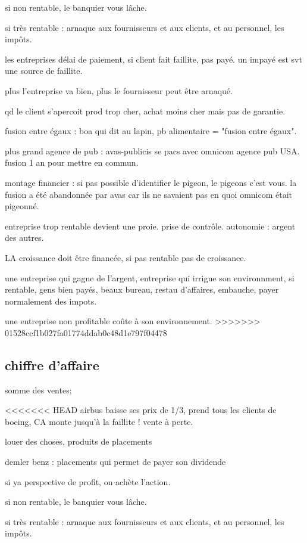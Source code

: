 \documentclass[a4paper,12pt]{article}
\begin{document}
si non rentable, le banquier vous lâche.

si très rentable : arnaque aux fournisseurs et aux clients, et au personnel, les impôts.

les entreprises délai de paiement, si client fait faillite, pas payé.
un impayé est svt une source de faillite.

plus l'entreprise va bien, plus le fournisseur peut être arnaqué.

qd le client s'apercoit prod trop cher, achat moins cher mais pas de garantie.


fusion entre égaux : boa qui dit au lapin, pb alimentaire = "fusion entre égaux".

plus grand agence de pub : avas-publicis se pacs avec omnicom agence pub USA.
fusion 1 an pour mettre en commun. 

montage financier : si pas possible d'identifier le pigeon, le pigeons c'est vous.
la fusion a été abandonnée par avas car ils ne savaient pas en quoi omnicom était pigeonné.


entreprise trop rentable devient une proie. prise de contrôle.
autonomie : argent des autres.


LA croissance doit être financée, si pas rentable pas de croissance.

une entreprise qui gagne de l'argent, entreprise qui irrigue son environnment,
si rentable, gens bien payés, beaux bureau, restau d'affaires, embauche, payer normalement 
des impots.

une entreprise non profitable coûte à son environnement.
>>>>>>> 01528ccf1b027fa01774ddab0c48d1e797f04478

\subsection{chiffre d'affaire}
somme des ventes;

<<<<<<< HEAD
airbus baisse ses prix de 1/3, prend tous les clients de boeing, CA monte jusqu'à la faillite ! vente à perte.

louer des choses,
produits de placements

demler benz : placements qui permet de payer son dividende

si ya perspective de profit, on achète l'action.
 
si non rentable, le banquier vous lâche.

si très rentable : arnaque aux fournisseurs et aux clients, et au personnel, les impôts.
\end{document}
